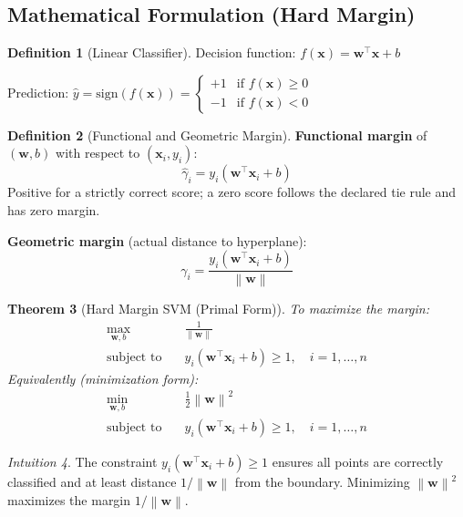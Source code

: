 \documentclass[11pt,twoside]{article}
\numberwithin{equation}{section}
\newcommand{\vect}[1]{\bm{#1}}
\newcommand{\norm}[1]{\left\lVert#1\right\rVert}
\theoremstyle{plain}
\newtheorem{theorem}{Theorem}[section]
\theoremstyle{definition}
\newtheorem{definition}[theorem]{Definition}
\theoremstyle{remark}
\newtheorem{intuition}[theorem]{Intuition}
\begin{document}
\subsection{Mathematical Formulation (Hard Margin)}

\begin{definition}[Linear Classifier]
Decision function: $f(\vect{x}) = \vect{w}^\top\vect{x} + b$

Prediction: $\hat{y} = \text{sign}(f(\vect{x})) = \begin{cases} +1 & \text{if } f(\vect{x}) \geq 0 \\ -1 & \text{if } f(\vect{x}) < 0 \end{cases}$
\end{definition}

\begin{definition}[Functional and Geometric Margin]
\textbf{Functional margin} of $(\vect{w}, b)$ with respect to $(\vect{x}_i, y_i)$:
\[
\hat{\gamma}_i = y_i(\vect{w}^\top\vect{x}_i + b)
\]
Positive for a strictly correct score; a zero score follows the declared tie rule and has zero margin.

\textbf{Geometric margin} (actual distance to hyperplane):
\[
\gamma_i = \frac{y_i(\vect{w}^\top\vect{x}_i + b)}{\norm{\vect{w}}}
\]
\end{definition}

\begin{theorem}[Hard Margin SVM (Primal Form)]
To maximize the margin:
\[
\begin{aligned}
\max_{\vect{w}, b} \quad & \frac{1}{\norm{\vect{w}}} \\
\text{subject to} \quad & y_i(\vect{w}^\top\vect{x}_i + b) \geq 1, \quad i = 1, \ldots, n
\end{aligned}
\]
Equivalently (minimization form):
\[
\begin{aligned}
\min_{\vect{w}, b} \quad & \frac{1}{2}\norm{\vect{w}}^2 \\
\text{subject to} \quad & y_i(\vect{w}^\top\vect{x}_i + b) \geq 1, \quad i = 1, \ldots, n
\end{aligned}
\]
\end{theorem}

\begin{intuition}
The constraint $y_i(\vect{w}^\top\vect{x}_i + b) \geq 1$ ensures all points are correctly classified and at least distance $1/\norm{\vect{w}}$ from the boundary. Minimizing $\norm{\vect{w}}^2$ maximizes the margin $1/\norm{\vect{w}}$.
\end{intuition}
\end{document}
